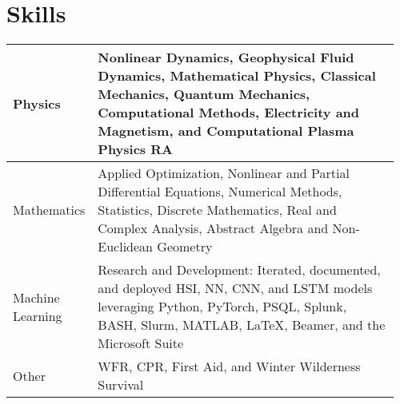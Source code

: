 \documentclass[letterpaper,11pt]{article}
\begin{document}
\section{\color{cvblue}Skills}
\vspace{-.25in}
\begin{table}[h!]
    \setlength{\tabcolsep}{8pt}
    \renewcommand{\arraystretch}{2}
    \centering
    \begin{tabular}{p{0.16\linewidth} || p{0.8\linewidth}}
        Physics& Nonlinear Dynamics, Geophysical Fluid Dynamics, Mathematical Physics, Classical Mechanics,
        Quantum Mechanics, Computational Methods, Electricity and Magnetism, and Computational Plasma Physics RA \\\hline
        Mathematics& Applied Optimization, Nonlinear and Partial Differential Equations, Numerical Methods, Statistics, Discrete Mathematics, Real and Complex Analysis, Abstract Algebra and Non-Euclidean Geometry \\\hline
        Machine Learning & Research and Development: Iterated, documented, and deployed HSI, NN, CNN, and LSTM models leveraging Python, PyTorch, PSQL, Splunk, BASH, Slurm, MATLAB, \LaTeX,  Beamer, and the Microsoft Suite \\\hline
        Other& WFR, CPR, First Aid, and Winter Wilderness Survival\\\hline
    \end{tabular}
\end{table}




    \setlength{\itemsep}{-.5pt}
\end{document}
